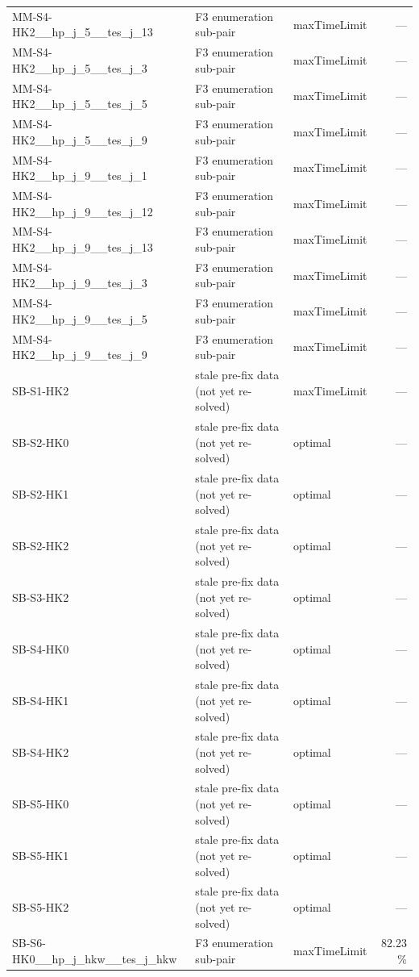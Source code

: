\begin{table}[htbp]
\begin{tabular}{lllr}
  MM-S4-HK2\_\_hp\_j\_5\_\_tes\_j\_13 & F3 enumeration sub-pair & maxTimeLimit & — \\
  MM-S4-HK2\_\_hp\_j\_5\_\_tes\_j\_3 & F3 enumeration sub-pair & maxTimeLimit & — \\
  MM-S4-HK2\_\_hp\_j\_5\_\_tes\_j\_5 & F3 enumeration sub-pair & maxTimeLimit & — \\
  MM-S4-HK2\_\_hp\_j\_5\_\_tes\_j\_9 & F3 enumeration sub-pair & maxTimeLimit & — \\
  MM-S4-HK2\_\_hp\_j\_9\_\_tes\_j\_1 & F3 enumeration sub-pair & maxTimeLimit & — \\
  MM-S4-HK2\_\_hp\_j\_9\_\_tes\_j\_12 & F3 enumeration sub-pair & maxTimeLimit & — \\
  MM-S4-HK2\_\_hp\_j\_9\_\_tes\_j\_13 & F3 enumeration sub-pair & maxTimeLimit & — \\
  MM-S4-HK2\_\_hp\_j\_9\_\_tes\_j\_3 & F3 enumeration sub-pair & maxTimeLimit & — \\
  MM-S4-HK2\_\_hp\_j\_9\_\_tes\_j\_5 & F3 enumeration sub-pair & maxTimeLimit & — \\
  MM-S4-HK2\_\_hp\_j\_9\_\_tes\_j\_9 & F3 enumeration sub-pair & maxTimeLimit & — \\
  SB-S1-HK2 & stale pre-fix data (not yet re-solved) & maxTimeLimit & — \\
  SB-S2-HK0 & stale pre-fix data (not yet re-solved) & optimal & — \\
  SB-S2-HK1 & stale pre-fix data (not yet re-solved) & optimal & — \\
  SB-S2-HK2 & stale pre-fix data (not yet re-solved) & optimal & — \\
  SB-S3-HK2 & stale pre-fix data (not yet re-solved) & optimal & — \\
  SB-S4-HK0 & stale pre-fix data (not yet re-solved) & optimal & — \\
  SB-S4-HK1 & stale pre-fix data (not yet re-solved) & optimal & — \\
  SB-S4-HK2 & stale pre-fix data (not yet re-solved) & optimal & — \\
  SB-S5-HK0 & stale pre-fix data (not yet re-solved) & optimal & — \\
  SB-S5-HK1 & stale pre-fix data (not yet re-solved) & optimal & — \\
  SB-S5-HK2 & stale pre-fix data (not yet re-solved) & optimal & — \\
  SB-S6-HK0\_\_hp\_j\_hkw\_\_tes\_j\_hkw & F3 enumeration sub-pair & maxTimeLimit & 82.23 \% \\

\end{tabular}
\end{table}
